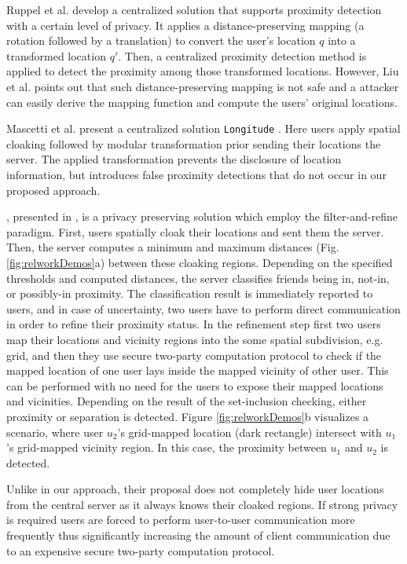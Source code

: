 Ruppel et al. \cite{proxDetTrans} develop a centralized solution that supports
proximity detection with a certain level of privacy. It applies a distance-preserving 
mapping (a rotation followed by a translation) to convert the user's location $q$ into 
a transformed location $q'$. Then, a centralized proximity detection method is 
applied to detect the proximity among those transformed locations. However, Liu 
et al. \cite{lgk06} points out that such distance-preserving mapping is not safe 
and a attacker can easily derive the mapping function and compute the users' original 
locations. 

Mascetti et al. present a centralized solution
\texttt{Longitude} \cite{longitudePaper}.
Here users apply spatial cloaking followed by modular transformation prior
sending their 
locations the server. The applied transformation prevents the disclosure of 
location information, but introduces false proximity detections that do not occur in our 
proposed approach.


\hc, presented in \cite{pbsPaper}, is a privacy preserving solution which employ
the filter-and-refine paradigm. First, users spatially cloak their locations and sent them the
server. Then, the server computes a minimum and maximum distances (Fig. \ref{fig:relworkDemos}a)
between these cloaking regions. Depending on the specified thresholds and computed distances, 
the server classifies friends being in, not-in, or possibly-in proximity. The classification 
result is immediately reported to users, and in case of uncertainty, two users have to perform 
direct communication in order to refine their proximity status. 
In the refinement step first two users map their locations 
and vicinity regions into the some spatial subdivision, e.g. grid, and then they use secure 
two-party computation protocol to check if the mapped location of one user lays inside the 
mapped vicinity of other user. This can be performed with no need for the users 
to expose their mapped locations and vicinities. Depending on the result of the 
set-inclusion checking, either proximity or separation is detected. Figure
\ref{fig:relworkDemos}b visualizes a scenario, where user $u_2$'s grid-mapped location
(dark rectangle) intersect with $u_1$'s grid-mapped vicinity region. In this case, 
the proximity between $u_1$ and $u_2$ is detected.

Unlike in our approach, their proposal does not completely hide user locations
from the central server as it always knows their cloaked regions. If strong
privacy is required users are forced to perform user-to-user communication more
frequently thus significantly increasing the amount of client communication due to
an expensive secure two-party computation protocol. 



